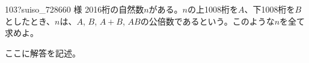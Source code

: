 \begin{prob}{103}{\hosi ?}{suiso\_728660 様}
 2016桁の自然数$n$がある。$n$の上1008桁を$A$、下1008桁を$B$としたとき、$n$は、$A$, $B$, $A+B$, $AB$の公倍数であるという。このような$n$を全て求めよ。
\end{prob}

ここに解答を記述。
